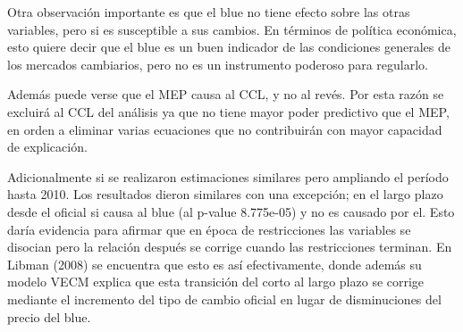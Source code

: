 \documentclass[11pt,a4paper]{article}
\begin{document}
Otra observación importante es que el blue no tiene efecto sobre las otras variables, pero si es susceptible a sus cambios. En términos de política económica, esto quiere decir que el blue es un buen indicador de las condiciones generales de los mercados cambiarios, pero no es un instrumento poderoso para regularlo.

Además puede verse que el MEP causa al CCL, y no al revés. Por esta razón se excluirá al CCL del análisis ya que no tiene mayor poder predictivo que el MEP, en orden a eliminar varias ecuaciones que no contribuirán con mayor capacidad de explicación.

Adicionalmente si se realizaron estimaciones similares pero ampliando el período hasta 2010. Los resultados dieron similares con una excepción; en el largo plazo desde el oficial si causa al blue (al p-value 8.775e-05) y no es causado por el. Esto daría evidencia para afirmar que en época de restricciones las variables se disocian pero la relación después se corrige cuando las restricciones terminan. En Libman (2008) se encuentra que esto es así efectivamente, donde además su modelo VECM explica que esta transición del corto al largo plazo se corrige mediante el incremento del tipo de cambio oficial en lugar de disminuciones del precio del blue. 


\begin{table}[H]
\centering
{}
\caption{VECM entre dólar ahorro y dólar blue (variables en logaritmos)}
\end{table}
\end{document}
